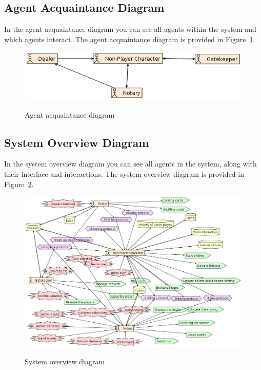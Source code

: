 \documentclass[a4paper]{article}
\begin{document}
\subsection{Agent Acquaintance Diagram}

In the agent acquaintance diagram you can see all agents within the system and which agents interact. The agent acquaintance diagram is provided in Figure~\ref{fig:agentacq}. 

\begin{figure}[htp]
  \centering
  \includegraphics[keepaspectratio,scale=0.45]{pdt/images/architectural_design/agent_acquaintance.png}
  \label{fig:agentacq}
  \caption{Agent acquaintance diagram}
\end{figure}

\subsection{System Overview Diagram}

In the system overview diagram you can see all agents in the system, along with their interface and interactions. The system overview diagram is provided in Figure~\ref{fig:sysovervw}.

\begin{figure}[htp]
  \centering
  \includegraphics[keepaspectratio,scale=0.45]{pdt/images/architectural_design/system_overview.png}
  \label{fig:sysovervw}
  \caption{System overview diagram}
\end{figure}
\end{document}
